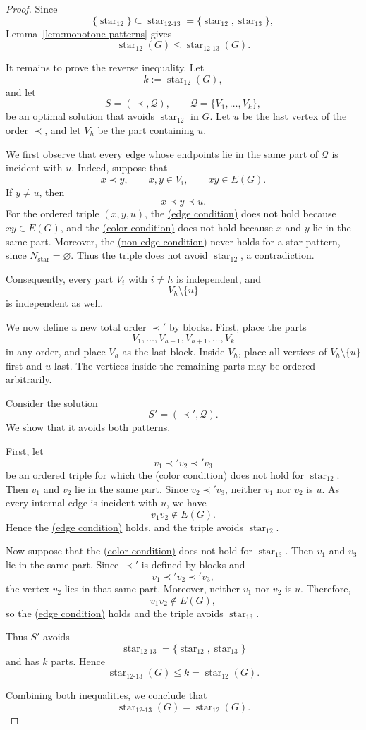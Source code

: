 \documentclass[12pt]{article}
\theoremstyle{plain}
\theoremstyle{definition}
\theoremstyle{remark}
\theoremstyle{definition}
\newcommand{\edgecondition}{%
  \hyperref[def:avoid:cond:edge]{(edge condition)}\xspace
}
\newcommand{\nonedgecondition}{%
  \hyperref[def:avoid:cond:nonedge]{(non-edge condition)}\xspace
}
\newcommand{\colorcondition}{%
  \hyperref[def:avoid:cond:color]{(color condition)}\xspace
}
\newcommand{\starlabel}{\mathrm{star}}
\DeclareRobustCommand{\starparam}[1]{%
  \ensuremath{\mathop{\starlabel}\nolimits_{#1}}%
}
\begin{document}
\begin{proof}
Since
\[
\{\starparam{12}\}
\subseteq
\starparam{12\text{-}13}
=
\{\starparam{12},\starparam{13}\},
\]
Lemma~\ref{lem:monotone-patterns} gives
\[
\starparam{12}(G)
\le
\starparam{12\text{-}13}(G).
\]

It remains to prove the reverse inequality. Let
\[
k:=\starparam{12}(G),
\]
and let
\[
S=(\prec,\mathcal Q),
\qquad
\mathcal Q=\{V_1,\dots,V_k\},
\]
be an optimal solution that avoids \(\starparam{12}\) in \(G\).
Let \(u\) be the last vertex of the order \(\prec\), and let \(V_h\) be
the part containing \(u\).

We first observe that every edge whose endpoints lie in the same part of
\(\mathcal Q\) is incident with \(u\). Indeed, suppose that
\[
x\prec y,
\qquad
x,y\in V_i,
\qquad
xy\in E(G).
\]
If \(y\neq u\), then
\[
x\prec y\prec u.
\]
For the ordered triple \((x,y,u)\), the \edgecondition{} does not hold
because \(xy\in E(G)\), and the \colorcondition{} does not hold because
\(x\) and \(y\) lie in the same part. Moreover, the
\nonedgecondition{} never holds for a star pattern, since
\(N_{\starlabel}=\varnothing\). Thus the triple does not avoid
\(\starparam{12}\), a contradiction.

Consequently, every part \(V_i\) with \(i\neq h\) is independent, and
\[
V_h\setminus\{u\}
\]
is independent as well.

We now define a new total order \(\prec'\) by blocks. First, place the
parts
\[
V_1,\dots,V_{h-1},V_{h+1},\dots,V_k
\]
in any order, and place \(V_h\) as the last block. Inside \(V_h\), place
all vertices of \(V_h\setminus\{u\}\) first and \(u\) last. The vertices
inside the remaining parts may be ordered arbitrarily.

Consider the solution
\[
S'=(\prec',\mathcal Q).
\]
We show that it avoids both patterns.

First, let
\[
v_1\prec' v_2\prec' v_3
\]
be an ordered triple for which the \colorcondition{} does not hold for
\(\starparam{12}\). Then \(v_1\) and \(v_2\) lie in the same part.
Since \(v_2\prec' v_3\), neither \(v_1\) nor \(v_2\) is \(u\).
As every internal edge is incident with \(u\), we have
\[
v_1v_2\notin E(G).
\]
Hence the \edgecondition{} holds, and the triple avoids
\(\starparam{12}\).

Now suppose that the \colorcondition{} does not hold for
\(\starparam{13}\). Then \(v_1\) and \(v_3\) lie in the same part.
Since \(\prec'\) is defined by blocks and
\[
v_1\prec' v_2\prec' v_3,
\]
the vertex \(v_2\) lies in that same part. Moreover, neither \(v_1\) nor
\(v_2\) is \(u\). Therefore,
\[
v_1v_2\notin E(G),
\]
so the \edgecondition{} holds and the triple avoids
\(\starparam{13}\).

Thus \(S'\) avoids
\[
\starparam{12\text{-}13}
=
\{\starparam{12},\starparam{13}\}
\]
and has \(k\) parts. Hence
\[
\starparam{12\text{-}13}(G)
\le
k
=
\starparam{12}(G).
\]

Combining both inequalities, we conclude that
\[
\starparam{12\text{-}13}(G)
=
\starparam{12}(G).
\]
\end{proof}
\end{document}
